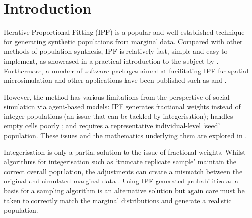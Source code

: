 \documentclass{JASSS}
\begin{document}



\section{Introduction}\label{introduction}

Iterative Proportional Fitting (IPF) is a popular and well-established
technique for generating synthetic populations from marginal data.
Compared with other methods of population synthesis, IPF is relatively
fast, simple and easy to implement, as showcased in a practical
introduction to the subject by \cite{lovelace_spatial_2016}. Furthermore,
a number of software packages aimed at facilitating IPF for spatial
microsimulation and other applications have been published
such as \cite{barthelemy_cran_2016} and \cite{jones_raker:_2016}.

However, the method has various limitations from the perspective of
social simulation via agent-based models: IPF
generates fractional weights instead of integer populations
(an issue that can be tackled by integerisation);
handles empty cells poorly \citep{lovelace_evaluating_2015};
and requires a representative individual-level `seed' population.
These issues and the mathematics underlying them are explored
in \cite{zaloznik_iterative_2011}.

Integerisation is only a partial solution to the issue of fractional weights. Whilst
algorithms for integerisation such as `truncate replicate sample'
maintain the correct overall population, the adjustments can create a mismatch between the original
and simulated marginal data \citep{lovelace_truncate_2013}. Using IPF-generated probabilities as a basis for a sampling algorithm is an alternative solution but again care must be taken to correctly match the marginal distributions and generate a realistic population.   
\end{document}
